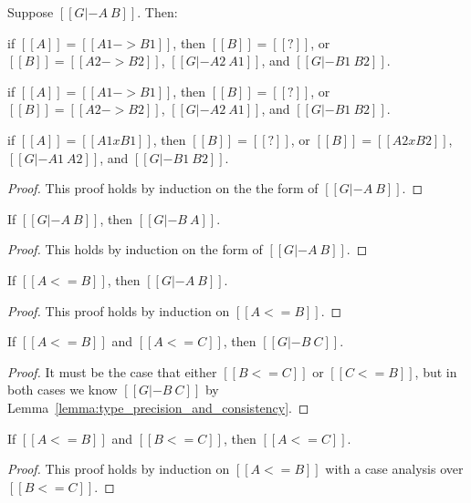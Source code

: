\begin{lemma}
  \label{lemma:inversion_of_type_consistency}
  Suppose $[[G |- A ~ B]]$. Then:
  \begin{enumR}\small
  \item if $[[A]] = [[A1 -> B1]]$, then $[[B]] = [[?]]$, or
    $[[B]] = [[A2 -> B2]]$, $[[G |- A2 ~ A1]]$, and $[[G |- B1 ~ B2]]$.
  \item if $[[A]] = [[A1 -> B1]]$, then $[[B]] = [[?]]$, or
    $[[B]] = [[A2 -> B2]]$, $[[G |- A2 ~ A1]]$, and $[[G |- B1 ~ B2]]$.
  \item if $[[A]] = [[A1 x B1]]$, then $[[B]] = [[?]]$, or
    $[[B]] = [[A2 x B2]]$, $[[G |- A1 ~ A2]]$, and $[[G |- B1 ~ B2]]$.
  \end{enumR}
\end{lemma}
\begin{proof}
  This proof holds by induction on the the form of $[[G |- A ~ B]]$.
\end{proof}

\begin{lemma}
  \label{lemma:symmetry_for_type_consistency}
  If $[[G |- A ~ B]]$, then $[[G |- B ~ A]]$.
\end{lemma}
\begin{proof}
  This holds by induction on the form of $[[G |- A ~ B]]$.
\end{proof}

\begin{lemma}
  \label{lemma:type_precision_and_consistency}
  If $[[A <= B]]$, then $[[G |- A ~ B]]$.
\end{lemma}
\begin{proof}
  This proof holds by induction on $[[A <= B]]$.
\end{proof}

\begin{lemma}
  \label{lemma:type_precision_triangle_consistenty}  
  If $[[A <= B]]$ and $[[A <= C]]$, then $[[G |- B ~ C]]$.
\end{lemma}
\begin{proof}
  It must be the case that either $[[B <= C]]$ or $[[C <= B]]$, but in both cases
  we know $[[G |- B ~ C]]$ by Lemma~\ref{lemma:type_precision_and_consistency}.
\end{proof}

\begin{lemma}
  \label{lemma:transitivity_for_type_precision}
  If $[[A <= B]]$ and $[[B <= C]]$, then $[[A <= C]]$.
\end{lemma}
\begin{proof}
  This proof holds by induction on $[[A <= B]]$ with
  a case analysis over $[[B <= C]]$.
\end{proof}

